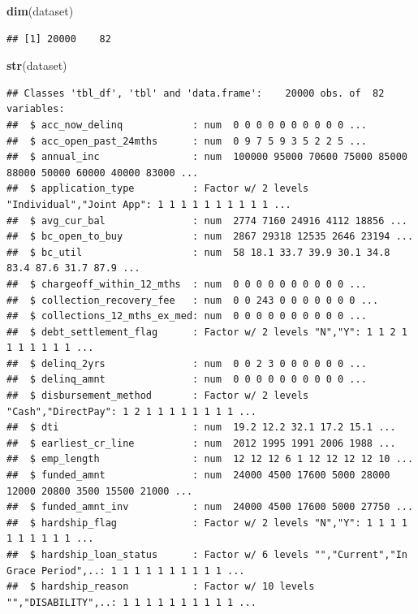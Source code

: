 \documentclass[]{article}
\newenvironment{Shaded}{\begin{snugshade}}{\end{snugshade}}
\newcommand{\KeywordTok}[1]{\textcolor[rgb]{0.13,0.29,0.53}{\textbf{#1}}}
\newcommand{\NormalTok}[1]{#1}
\begin{document}
\begin{Shaded}
\begin{Highlighting}[]
  \KeywordTok{dim}\NormalTok{(dataset)}
\end{Highlighting}
\end{Shaded}

\begin{verbatim}
## [1] 20000    82
\end{verbatim}

\begin{Shaded}
\begin{Highlighting}[]
  \KeywordTok{str}\NormalTok{(dataset)}
\end{Highlighting}
\end{Shaded}

\begin{verbatim}
## Classes 'tbl_df', 'tbl' and 'data.frame':    20000 obs. of  82 variables:
##  $ acc_now_delinq            : num  0 0 0 0 0 0 0 0 0 0 ...
##  $ acc_open_past_24mths      : num  0 9 7 5 9 3 5 2 2 5 ...
##  $ annual_inc                : num  100000 95000 70600 75000 85000 88000 50000 60000 40000 83000 ...
##  $ application_type          : Factor w/ 2 levels "Individual","Joint App": 1 1 1 1 1 1 1 1 1 1 ...
##  $ avg_cur_bal               : num  2774 7160 24916 4112 18856 ...
##  $ bc_open_to_buy            : num  2867 29318 12535 2646 23194 ...
##  $ bc_util                   : num  58 18.1 33.7 39.9 30.1 34.8 83.4 87.6 31.7 87.9 ...
##  $ chargeoff_within_12_mths  : num  0 0 0 0 0 0 0 0 0 0 ...
##  $ collection_recovery_fee   : num  0 0 243 0 0 0 0 0 0 0 ...
##  $ collections_12_mths_ex_med: num  0 0 0 0 0 0 0 0 0 0 ...
##  $ debt_settlement_flag      : Factor w/ 2 levels "N","Y": 1 1 2 1 1 1 1 1 1 1 ...
##  $ delinq_2yrs               : num  0 0 2 3 0 0 0 0 0 0 ...
##  $ delinq_amnt               : num  0 0 0 0 0 0 0 0 0 0 ...
##  $ disbursement_method       : Factor w/ 2 levels "Cash","DirectPay": 1 2 1 1 1 1 1 1 1 1 ...
##  $ dti                       : num  19.2 12.2 32.1 17.2 15.1 ...
##  $ earliest_cr_line          : num  2012 1995 1991 2006 1988 ...
##  $ emp_length                : num  12 12 12 6 1 12 12 12 12 10 ...
##  $ funded_amnt               : num  24000 4500 17600 5000 28000 12000 20800 3500 15500 21000 ...
##  $ funded_amnt_inv           : num  24000 4500 17600 5000 27750 ...
##  $ hardship_flag             : Factor w/ 2 levels "N","Y": 1 1 1 1 1 1 1 1 1 1 ...
##  $ hardship_loan_status      : Factor w/ 6 levels "","Current","In Grace Period",..: 1 1 1 1 1 1 1 1 1 1 ...
##  $ hardship_reason           : Factor w/ 10 levels "","DISABILITY",..: 1 1 1 1 1 1 1 1 1 1 ...

\end{verbatim}
\end{document}
